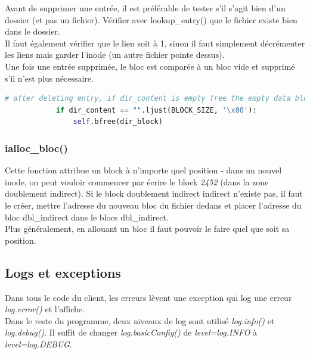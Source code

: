 \documentclass[a4paper,12pt]{article}
\begin{document}
Avant de supprimer une entrée, il est préférable de tester s'il s'agit bien d'un dossier (et pas un fichier). Vérifier avec lookup\_entry() que le fichier existe bien dans le dossier.\\

Il faut également vérifier que le lien soit à 1, sinon il faut simplement décrémenter les liens mais garder l'inode (un autre fichier pointe dessus).\\

Une fois une entrée supprimée, le bloc est comparée à un bloc vide et supprimé s'il  n'est plus nécessaire.\\

\begin{lstlisting}[language=python, caption=test after del\_entry()]
            # after deleting entry, if dir_content is empty free the empty data bloc
            if dir_content == "".ljust(BLOCK_SIZE, '\x00'):
                self.bfree(dir_block)
\end{lstlisting}


\subsubsection*{ialloc\_bloc()}

Cette fonction attribue un block à n'importe quel position - dans un nouvel inode, on peut vouloir commencer par écrire le block \emph{2452} (dans la zone doublement indirect). Si le block doublement indirect indirect n'existe pas, il faut le créer, mettre l'adresse du nouveau bloc du fichier dedans et placer l'adresse du bloc dbl\_indirect dans le blocs dbl\_indirect.\\

Plus généralement, en allouant un bloc il faut pouvoir le faire quel que soit sa position.\\


\subsection{Logs et exceptions}

Dans tous le code du client, les erreurs lèvent une exception qui log une erreur \emph{log.error()} et l'affiche.\\

Dans le reste du programme, deux niveaux de log sont utilisé \emph{log.info()} et \emph{log.debug()}. Il suffit de changer \emph{log.basicConfig()} de \emph{level=log.INFO} à  \emph{level=log.DEBUG}.\\
\end{document}
